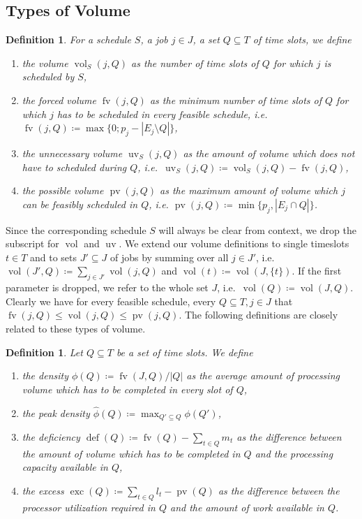 \documentclass[a4paper]{article}
\DeclareMathOperator{\fv}{fv}
\DeclareMathOperator{\uv}{uv}
\DeclareMathOperator{\pv}{pv}
\DeclareMathOperator{\vol}{vol}
\DeclareMathOperator{\opdef}{def}
\DeclareMathOperator{\exc}{exc}
\newtheorem{definition}[theorem]{Definition}
\begin{document}
\subsection{Types of Volume}
\begin{definition}
  For a schedule $S$, a job $j \in J$, a set $Q \subseteq T$ of time slots, we define
  \begin{enumerate}
    \item
      the \emph{volume} $\vol_S(j, Q)$ as the number of time slots of $Q$ for which $j$ is scheduled by $S$,
    \item
      the \emph{forced volume} $\fv(j, Q)$ as the minimum number of time slots of $Q$ for which $j$ has to be scheduled in every feasible schedule, i.e.\ $\fv(j, Q) \coloneqq \max\{0; p_j - |E_j \setminus Q|\}$,
    \item
      the \emph{unnecessary volume} $\uv_S(j, Q)$ as the amount of volume which does not have to scheduled during $Q$, i.e.\ $\uv_S(j, Q) \coloneqq \vol_S(j, Q) - \fv(j,Q)$,
    \item
      the \emph{possible volume} $\pv(j, Q)$ as the maximum amount of volume which $j$ can be feasibly scheduled in $Q$, i.e.
    $\pv(j, Q) \coloneqq \min\{ p_j, | E_j \cap Q | \}$.
  \end{enumerate}
\end{definition}
Since the corresponding schedule $S$ will always be clear from context, we drop the subscript for $\vol$ and $\uv$.
We extend our volume definitions to single timeslots $t\in T$ and to sets $J' \subseteq J$ of jobs by summing over all $j \in J'$, i.e.
$\vol(J', Q) \coloneqq \sum_{j \in J'} \vol(j, Q)$ and
$\vol(t) \coloneqq \vol(J, \{t\})$.
If the first parameter is dropped, we refer to the whole set $J$, i.e.\ $\vol(Q) \coloneqq \vol(J, Q)$.
Clearly we have for every feasible schedule, every $Q \subseteq T, j \in J$ that $\fv(j, Q) \leq \vol(j, Q) \leq \pv(j, Q)$.
The following definitions are closely related to these types of volume.
\begin{definition}
  Let $Q \subseteq T$ be a set of time slots.
  We define
  \begin{enumerate}
    \item
      the \emph{density} $\phi(Q) \coloneqq \fv(J, Q) / |Q|$ as the average amount of processing volume which has to be completed in every slot of $Q$,
    \item
      the \emph{peak density} $\hat \phi(Q) \coloneqq \max_{Q' \subseteq Q} \phi(Q')$,
    \item
      the \emph{deficiency} $\opdef(Q) \coloneqq \fv(Q) - \sum_{t \in Q} m_t$ as the difference between the amount of volume which has to be completed in $Q$ and the processing capacity available in $Q$,
    \item
      the \emph{excess} $\exc(Q) \coloneqq \sum_{t \in Q} l_t - \pv(Q)$ as the difference between the processor utilization required in $Q$ and the amount of work available in $Q$.
  \end{enumerate}
\end{definition}
\end{document}
